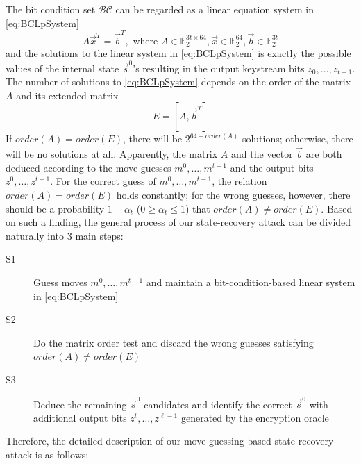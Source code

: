The bit condition set $\mathcal{BC}$ can be regarded as a linear equation system in \eqref{eq:BCLpSystem}
\begin{equation}\label{eq:BCLpSystem}
  A\vec x^T=\vec b^T, \text{ where } A\in \mathbb{F}_2^{3t\times 64}, \vec x\in \mathbb{F}_2^{64}, \vec b\in \mathbb{F}_2^{3t}
\end{equation}
and the solutions to the linear system in \eqref{eq:BCLpSystem} is exactly the possible values of the internal state $\vec{s}^0$'s resulting in the output keystream bits $z_0,\ldots, z_{t-1}$.
The number of solutions to \eqref{eq:BCLpSystem} depends on the order of the matrix $A$ and its extended matrix
\begin{equation}\label{eq:ExtendedMatrixOfA}
  E=[A,\vec b^T]
\end{equation}
If $order(A)=order(E)$, there will be $2^{64-order(A)}$ solutions; otherwise, there will be no solutions at all.
Apparently, the matrix $A$ and the vector $\vec b$ are both deduced according to the move guesses $m^0,\ldots, m^{t-1}$ and the output bits $z^0,\ldots, z^{t-1}$.
For the correct guess of $m^0,\ldots, m^{t-1}$, the relation $order(A)=order(E)$ holds constantly; for the wrong guesses, however, there should be a probability $1-\alpha_t$ ($0\geq \alpha_t\leq 1$) that $order(A)\neq order(E)$.
Based on such a finding, the general process of our state-recovery attack can be divided naturally into 3 main steps:
\begin{description}
  \item[S1] Guess moves $m^0,\ldots, m^{t-1}$ and maintain a bit-condition-based linear system in \eqref{eq:BCLpSystem}
  \item[S2] Do the matrix order test and discard the wrong guesses satisfying  $order(A)\neq order(E)$
  \item[S3] Deduce the remaining $\vec{s}^0$ candidates and identify the correct $\vec{s}^0$ with additional output bits $z^{t},\ldots, z^{\ell-1}$ generated by the encryption oracle
\end{description}
Therefore, the detailed description of our move-guessing-based state-recovery attack is as follows:
